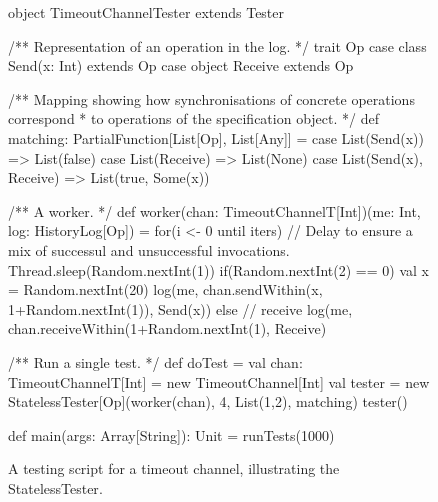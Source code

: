 \begin{figure}
\begin{scala}
object TimeoutChannelTester extends Tester{
  /** Representation of an operation in the log. */
  trait Op
  case class Send(x: Int) extends Op
  case object Receive extends Op

  /** Mapping showing how synchronisations of concrete operations correspond 
    * to operations of the specification object.   */
  def matching: PartialFunction[List[Op], List[Any]] = {
    case List(Send(x)) => List(false)
    case List(Receive) => List(None)
    case List(Send(x), Receive) => List(true, Some(x))
  }

  /** A worker. */
  def worker(chan: TimeoutChannelT[Int])(me: Int, log: HistoryLog[Op]) = {
    for(i <- 0 until iters){
      // Delay to ensure a mix of successul and unsuccessful invocations.
      Thread.sleep(Random.nextInt(1))
      if(Random.nextInt(2) == 0){
        val x = Random.nextInt(20)
        log(me, chan.sendWithin(x, 1+Random.nextInt(1)), Send(x))
      }
      else // receive
        log(me, chan.receiveWithin(1+Random.nextInt(1), Receive)
    }
  }

  /** Run a single test. */
  def doTest = {
    val chan: TimeoutChannelT[Int] = new TimeoutChannel[Int]
    val tester = new StatelessTester[Op](worker(chan), 4, List(1,2), matching)
    tester()
  }

  def main(args: Array[String]): Unit = runTests(1000) 
}
\end{scala}
\caption{A testing script for a timeout channel, illustrating the {\scalashape
    Stateless\-Tester}.\label{fig:timeout-chan}} 
\end{figure}



